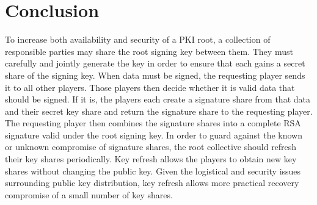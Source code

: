 \section{Conclusion}


To increase both availability and security of a PKI root, a collection
of responsible parties may share the root signing key between
them. They must carefully and jointly generate the key in order to
ensure that each gains a secret share of the signing key. When data
must be signed, the requesting player sends it to all other
players. Those players then decide whether it is valid data that
should be signed. If it is, the players each create a signature share
from that data and their secret key share and return the signature
share to the requesting player. The requesting player then combines
the signature shares into a complete RSA signature valid under the
root signing key. In order to guard against the known or unknown
compromise of signature shares, the root collective should refresh
their key shares periodically. Key refresh allows the players to
obtain new key shares without changing the public key. Given the
logistical and security issues surrounding public key distribution,
key refresh allows more practical recovery compromise of a small
number of key shares.
